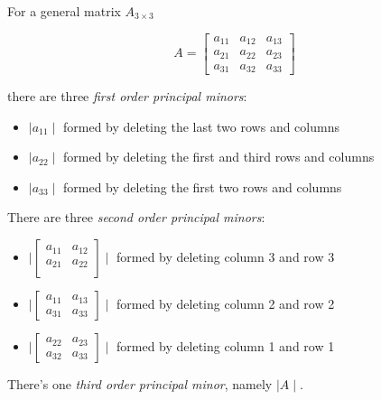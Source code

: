 \documentclass[12pt,openright,twoside,a4paper]{book}
\begin{document}
For a general matrix $A_{3\times 3}$ 

\begin{equation}
A=
\begin{bmatrix}
         a_{11} & a_{12} & a_{13} \\
    	    a_{21} & a_{22} & a_{23} \\ 
	    a_{31} & a_{32} & a_{33}  
\end{bmatrix}
\end{equation}

\vspace{5mm}

there are three \textit{first order principal minors}:

\begin{itemize}
\item $\mid a_{11}\mid$ formed by deleting the last two rows and columns
\item $\mid a_{22}\mid$ formed by deleting the first and third rows and columns
\item $\mid a_{33}\mid$ formed by deleting the first two rows and columns

\end{itemize}

There are three \textit{second order principal minors}:

\begin{itemize}
\item 
$\mid\begin{bmatrix}
         a_{11} & a_{12}  \\
    	    a_{21} & a_{22}  \\ 
\end{bmatrix}\mid$ formed by deleting column 3 and row 3

\item
$\mid\begin{bmatrix}
         a_{11}  & a_{13} \\
	    a_{31}  & a_{33}  
\end{bmatrix}\mid$ formed by deleting column 2 and row 2

\item
$\mid\begin{bmatrix}
         a_{22} & a_{23} \\ 
	     a_{32} & a_{33}  
\end{bmatrix}\mid$ formed by deleting column 1 and row 1

\end{itemize}

There's one \textit{third order principal minor}, namely $\mid A\mid$.
\end{document}
